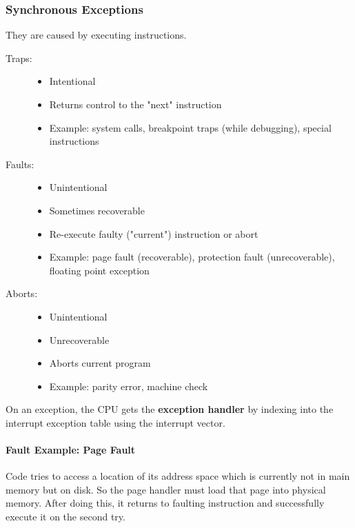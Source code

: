 \subsubsection{Synchronous Exceptions}
They are caused by executing instructions.

\begin{description}
    \item[Traps:] 
        \begin{itemize}
            \item Intentional
            \item Returns control to the "next" instruction
            \item Example: system calls, breakpoint traps (while debugging), special instructions
        \end{itemize}
    \item[Faults:]
        \begin{itemize}
            \item Unintentional
            \item Sometimes recoverable
            \item Re-execute faulty ("current") instruction or abort
            \item Example: page fault (recoverable), protection fault (unrecoverable), floating point exception
        \end{itemize}
    \item[Aborts:]
        \begin{itemize}
            \item Unintentional
            \item Unrecoverable
            \item Aborts current program
            \item Example: parity error, machine check
        \end{itemize}
\end{description}

On an exception, the CPU gets the \textbf{exception handler} by indexing into the interrupt exception table using the interrupt vector.

\paragraph{Fault Example: Page Fault}
Code tries to access a location of its address space which is currently not in main memory but on disk. So the page handler must load that page into physical memory. After doing this, it returns to faulting instruction and successfully execute it on the second try.


